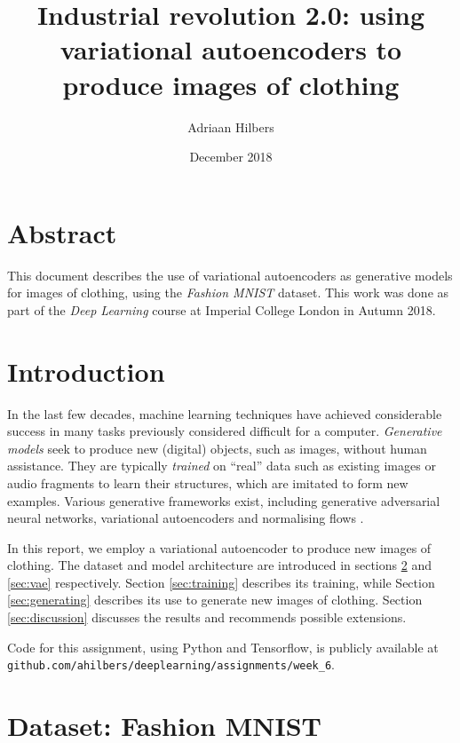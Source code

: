 \documentclass[]{article}
\title{\vspace{-8ex} Industrial revolution 2.0: using variational autoencoders to produce images of clothing}
\author{Adriaan Hilbers}
\date{December 2018}
\begin{document}
\maketitle




\section*{Abstract}
\label{sec:abstrct}

This document describes the use of variational autoencoders as generative models for images of clothing, using the \textit{Fashion MNIST} dataset. This work was done as part of the \textit{Deep Learning} course at Imperial College London in Autumn 2018.




\section{Introduction}
\label{sec:introduction}

\hspace{\parindent} In the last few decades, machine learning techniques have achieved considerable success in many tasks previously considered difficult for a computer. \textit{Generative models} seek to produce new (digital) objects, such as images, without human assistance. They are typically \textit{trained} on ``real'' data such as existing images or audio fragments to learn their structures, which are imitated to form new examples. Various generative frameworks exist, including generative adversarial neural networks, variational autoencoders and normalising flows \cite{notes}. 

In this report, we employ a variational autoencoder to produce new images of clothing. The dataset and model architecture are introduced in sections \ref{sec:dataset} and \ref{sec:vae} respectively. Section \ref{sec:training} describes its training, while Section \ref{sec:generating} describes its use to generate new images of clothing. Section \ref{sec:discussion} discusses the results and recommends possible extensions.

Code for this assignment, using Python and Tensorflow, is publicly available at \texttt{github.com/ahilbers/deeplearning/assignments/week\_6}. 




\section{Dataset: Fashion MNIST}
\label{sec:dataset}
\end{document}
